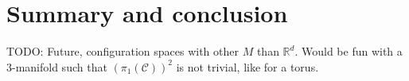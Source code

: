 \documentclass[a4paper,10pt,oneside]{book}
\theoremstyle{plain}
\theoremstyle{definition}
\theoremstyle{remark}
\begin{document}
\chapter{Summary and conclusion}

TODO: Future, configuration spaces with other $M$ than $\mathbb{R}^d$. Would be fun with a 3-manifold such that $(\pi_1(\mathcal{C}))^2$ is not trivial, like for a torus.










\end{document}
